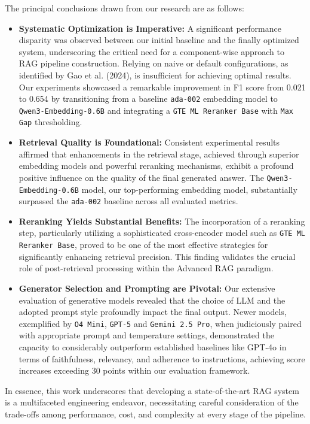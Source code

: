 The principal conclusions drawn from our research are as follows:
\begin{itemize}
    \item \textbf{Systematic Optimization is Imperative:} A significant performance disparity was observed between our initial baseline and the finally optimized system, underscoring the critical need for a component-wise approach to RAG pipeline construction. Relying on naive or default configurations, as identified by Gao et al. (2024), is insufficient for achieving optimal results. Our experiments showcased a remarkable improvement in F1 score from 0.021 to 0.654 by transitioning from a baseline \texttt{ada-002} embedding model to \texttt{Qwen3-Embedding-0.6B} and integrating a \texttt{GTE ML Reranker Base} with \texttt{Max Gap} thresholding.
    \item \textbf{Retrieval Quality is Foundational:} Consistent experimental results affirmed that enhancements in the retrieval stage, achieved through superior embedding models and powerful reranking mechanisms, exhibit a profound positive influence on the quality of the final generated answer. The \texttt{Qwen3-Embedding-0.6B} model, our top-performing embedding model, substantially surpassed the \texttt{ada-002} baseline across all evaluated metrics.
    \item \textbf{Reranking Yields Substantial Benefits:} The incorporation of a reranking step, particularly utilizing a sophisticated cross-encoder model such as \texttt{GTE ML Reranker Base}, proved to be one of the most effective strategies for significantly enhancing retrieval precision. This finding validates the crucial role of post-retrieval processing within the Advanced RAG paradigm.
    \item \textbf{Generator Selection and Prompting are Pivotal:} Our extensive evaluation of generative models revealed that the choice of LLM and the adopted prompt style profoundly impact the final output. Newer models, exemplified by \texttt{O4 Mini}, \texttt{GPT-5} and \texttt{Gemini 2.5 Pro}, when judiciously paired with appropriate prompt and temperature settings, demonstrated the capacity to considerably outperform established baselines like GPT-4o in terms of faithfulness, relevancy, and adherence to instructions, achieving score increases exceeding 30 points within our evaluation framework.
\end{itemize}

In essence, this work underscores that developing a state-of-the-art RAG system is a multifaceted engineering endeavor, necessitating careful consideration of the trade-offs among performance, cost, and complexity at every stage of the pipeline.


